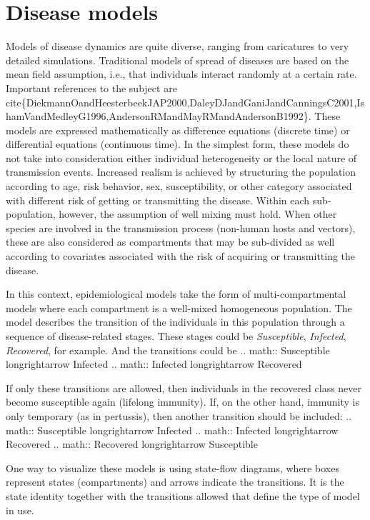 \documentclass[a4paper,10pt,english]{sphinxmanual}
\begin{document}
\section{Disease models}
\label{intromodels:disease-models}
Models of disease dynamics are quite diverse, ranging from caricatures
to very detailed simulations. Traditional models of spread of diseases
are based on the mean field assumption, i.e., that individuals
interact randomly at a certain rate. Important references to the
subject are
cite\{DiekmannOandHeesterbeekJAP2000,DaleyDJandGaniJandCanningsC2001,IshamVandMedleyG1996,AndersonRMandMayRMandAndersonB1992\}.
These models are expressed mathematically as difference equations
(discrete time) or differential equations (continuous time). In the
simplest form, these models do not take into consideration either
individual heterogeneity or the local nature of transmission
events. Increased realism is achieved by structuring the population according to age, risk behavior, sex, susceptibility, or other category associated with different risk of getting or transmitting the disease. Within each sub-population, however, the assumption of well mixing must hold. When other species are involved in the transmission process (non-human hosts and vectors), these are also considered as compartments that may be sub-divided as well according to covariates associated with the risk of acquiring or transmitting the disease.

In this context, epidemiological models take the form of multi-compartmental models where each compartment is a well-mixed homogeneous population. The model describes the transition of the individuals in this population through a sequence of disease-related stages. These stages could be \emph{Susceptible}, \emph{Infected}, \emph{Recovered}, for example. And the transitions could be
.. math:: Susceptible longrightarrow Infected
.. math:: Infected longrightarrow Recovered

If only these transitions are allowed, then individuals in the recovered class never become susceptible again (lifelong immunity). If, on the other hand, immunity is only temporary (as in pertussis), then another transition should be included:
.. math:: Susceptible longrightarrow Infected
.. math:: Infected longrightarrow Recovered
.. math:: Recovered longrightarrow Susceptible

One way to visualize these models is using state-flow diagrams, where boxes represent states (compartments) and arrows indicate the transitions. It is the state identity together with the transitions allowed that define the type of model in use.
\end{document}
